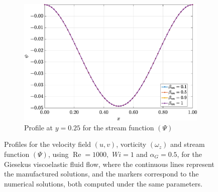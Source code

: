 \documentclass[preprint, 12pt]{elsarticle}
\begin{document}
\begin{figure}[H]
    \begin{subfigure}[b]{.46\textwidth}
        \includegraphics[width=\textwidth]{Slice_y_Tog_Numerical_NormErr_2nd_Betann_1_Re_1000_Wi_1_epsilon_0_xi_0_alphaG_0.5_Dt_1e-06_at_0.05_tipsim_1_MMS_12_x0.25y0.25_Psi.eps}
        \caption{Profile at $y=0.25$ for the stream function $(\Psi)$}
        \label{fig_slice_y_psi_2nd_Case1_giesekus_y025}
    \end{subfigure}
    \vspace{0.02cm}
    \caption{Profiles for the velocity field $(u,v)$, vorticity $(\omega_{z})$ and stream function $(\Psi)$, using $\operatorname{Re}=1000,$ $Wi=1$ and $\alpha_{G} = 0.5$, for the Giesekus viscoelastic fluid flow, where the continuous lines represent the manufactured solutions, and the markers correspond to the numerical solutions, both computed under the same parameters.\label{fig_slice_Solution_uvwzpsi_Giesekus_x025}}
\end{figure}
\end{document}
